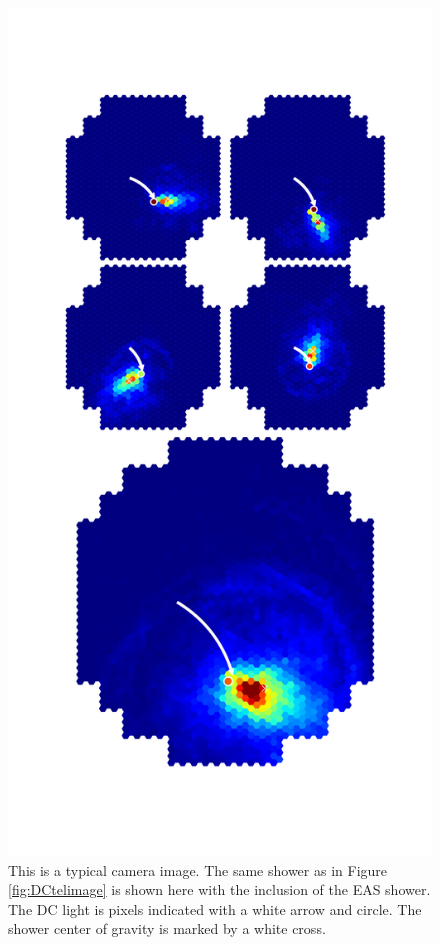 \documentclass[11pt]{article}
\begin{document}
\begin{figure}
\begin{minipage}{0.45\textwidth}
\label{fig:DCtelimage}
\end{minipage}\hfill
\begin{minipage}{0.45\textwidth}
\centering
\includegraphics[trim=80 120 80 150,clip,width=\textwidth]{graphfull}
\caption{This is a typical camera image. The same shower as in Figure \ref{fig:DCtelimage} is shown here with the inclusion of the EAS shower.  The DC light is pixels indicated with a white arrow and circle. The shower center of gravity is marked by a white cross.}
\label{fig:fulltelimage}
\end{minipage}
\restoregeometry
\end{figure}
\end{document}
